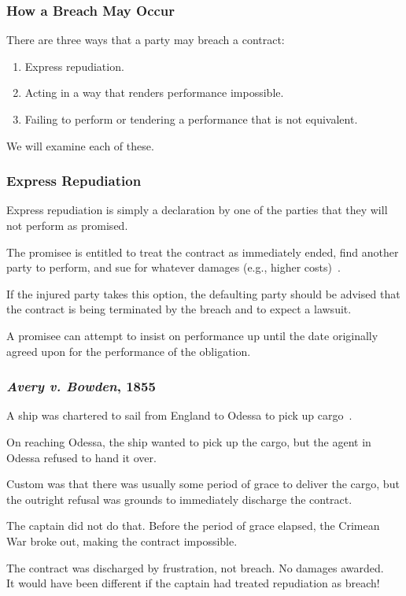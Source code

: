 \begin{frame}
\frametitle{How a Breach May Occur}

There are three ways that a party may breach a contract:

\begin{enumerate}
	\item Express repudiation.
	\item Acting in a way that renders performance impossible.
	\item Failing to perform or tendering a performance that is not equivalent.
\end{enumerate}

We will examine each of these.

\end{frame}



\begin{frame}
\frametitle{Express Repudiation}

Express repudiation is simply a declaration by one of the parties that they will not perform as promised.

The promisee is entitled to treat the contract as immediately ended, find another party to perform, and sue for whatever damages (e.g., higher costs)~\cite{lba}.

If the injured party takes this option, the defaulting party should be advised that the contract is being terminated by the breach and to expect a lawsuit.

A promisee can attempt to insist on performance up until the date originally agreed upon for the performance of the obligation. 

\end{frame}



\begin{frame}
\frametitle{\textit{Avery v. Bowden}, 1855}

A ship was chartered to sail from England to Odessa to pick up cargo~\cite{lba}.

On reaching Odessa, the ship wanted to pick up the cargo, but the agent in Odessa refused to hand it over.

Custom was that there was usually some period of grace to deliver the cargo, but the outright refusal was grounds to immediately discharge the contract.

The captain did not do that. Before the period of grace elapsed, the Crimean War broke out, making the contract impossible.

The contract was discharged by frustration, not breach. No damages awarded.\\
\quad It would have been different if the captain had treated repudiation as breach!

\end{frame}



